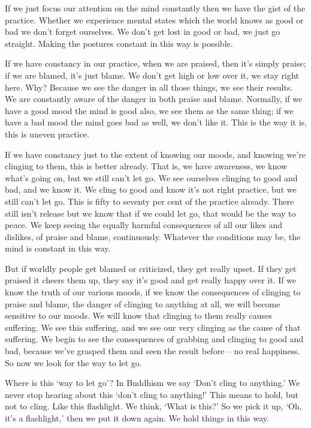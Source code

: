 If we just focus our attention on the mind constantly then we have the gist of the practice. Whether we experience mental states which the world knows as good or bad we don't forget ourselves. We don't get lost in good or bad, we just go straight. Making the postures constant in this way is possible. 

If we have constancy in our practice, when we are praised, then it's simply praise; if we are blamed, it's just blame. We don't get high or low over it, we stay right here. Why? Because we see the danger in all those things, we see their results. We are constantly aware of the danger in both praise and blame. Normally, if we have a good mood the mind is good also, we see them as the same thing; if we have a bad mood the mind goes bad as well, we don't like it. This is the way it is, this is uneven practice. 

If we have constancy just to the extent of knowing our moods, and knowing we're clinging to them, this is better already. That is, we have awareness, we know what's going on, but we still can't let go. We see ourselves clinging to good and bad, and we know it. We cling to good and know it's not right practice, but we still can't let go. This is fifty to seventy per cent of the practice already. There still isn't release but we know that if we could let go, that would be the way to peace. We keep seeing the equally harmful consequences of all our likes and dislikes, of praise and blame, continuously. Whatever the conditions may be, the mind is constant in this way. 

But if worldly people get blamed or criticized, they get really upset. If they get praised it cheers them up, they say it's good and get really happy over it. If we know the truth of our various moods, if we know the consequences of clinging to praise and blame, the danger of clinging to anything at all, we will become sensitive to our moods. We will know that clinging to them really causes suffering. We see this suffering, and we see our very clinging as the cause of that suffering. We begin to see the consequences of grabbing and clinging to good and bad, because we've grasped them and seen the result before -- no real happiness. So now we look for the way to let go. 

Where is this `way to let go'? In Buddhism we say `Don't cling to anything.' We never stop hearing about this `don't cling to anything!' This means to hold, but not to cling. Like this flashlight. We think, `What is this?' So we pick it up, `Oh, it's a flashlight,' then we put it down again. We hold things in this way. 

